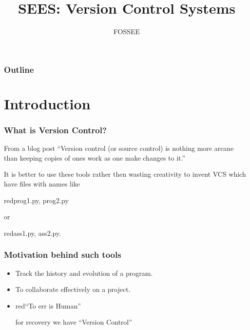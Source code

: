 \documentclass[14pt,compress]{beamer}
\title[Version Control Systems]{SEES: Version Control Systems}
\author[FOSSEE] {FOSSEE}
\institute[IIT Bombay] {Department of Aerospace Engineering\\IIT Bombay}
\date[]{}
\begin{document}
\begin{frame}
  \maketitle
\end{frame}

\begin{frame}
  \frametitle{Outline}
  \tableofcontents
\end{frame}


\section{Introduction}

\begin{frame}
  \frametitle{What is Version Control?}
  \begin{block}{From a blog post}
    ``Version control (or source control) is nothing more arcane than keeping copies of ones work as one make changes to it.''
  \end{block}
  \pause
  \begin{block}{}
    It is better to use these tools rather then wasting creativity to invent VCS which have files with names like \begin{color}{red}{prog1.py, prog2.py}\end{color} or \begin{color}{red}ass1.py, ass2.py.\end{color}
  \end{block}
\end{frame}

\begin{frame}
  \frametitle{Motivation behind such tools}
  \begin{itemize}
  \item Track the history and evolution of a program.
  \item To collaborate effectively on a project.
  \item \begin{color}{red}``To err is Human''\end{color} \pause for recovery we have ``Version Control''
  \end{itemize}
\end{frame}
\end{document}

